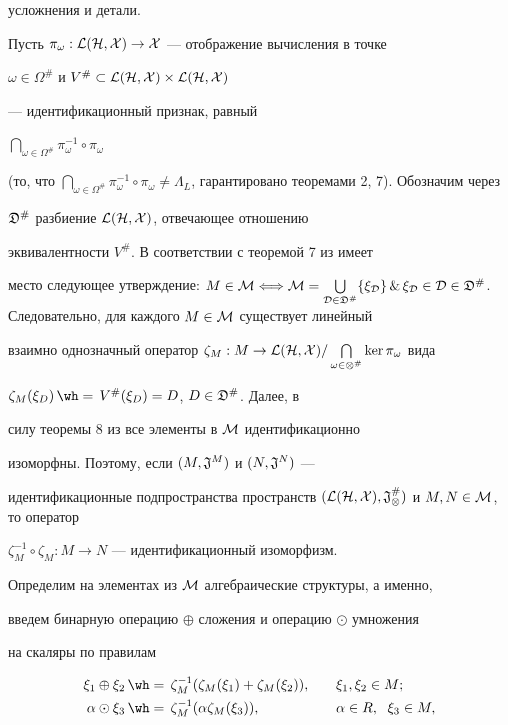 усложнения и детали. 


 


Пусть $\pi_\omega:\cal L(H,X)\to X$ --- отображение вычисления в точке 


$\omega\in\Omega^{\#}$ и $V^{\#}\subset\cal L(H,X)\times\cal L(H,X)$ 


--- идентификационный признак, равный 


$\bigcap\limits_{\omega\in\Omega^{\#}}\pi^{-1}_\omega\circ\pi_\omega$ 


(то, что $\bigcap\limits_{\omega\in\Omega^{\#}}\pi^{-1}_\omega\circ 


\pi_\omega\ne\Lambda_L$, гарантировано теоремами 2, 7). Обозначим через 


$\frak D^{\#}$ разбиение $\cal L(H,X)$, отвечающее отношению 


эквивалентности $V^{\#}$. В соответствии с теоремой 7 из \cite{1} имеет 


место следующее утверждение: $M\in\cal M\Longleftrightarrow 


M=\bigcup\limits_{D\in\frak D^{\#}}\{\xi_D\}\, \&\, \xi_D\in D\in\frak 


D^{\#}$. Следовательно, для каждого $M\in\cal M$ существует линейный 


взаимно однозначный оператор $\zeta_M:M\to\cal L(H,X)/ 


\bigcap\limits_{\omega\in\Omega^{\#}}\ker\pi_\omega$ вида 


$\zeta_M(\xi_D)\hateq V^{\#}(\xi_D)=D$, $D\in\frak D^{\#}$. Далее, в 


силу теоремы 8 из \cite{1} все элементы в $\cal M$ идентификационно 


изоморфны. Поэтому, если $(M,\frak J^M)$ и $(N,\frak J^N)$ --- 


идентификационные подпространства пространств $(\cal L(H,X),\frak 


J^{\#}_\Omega)$ и $M,N\in\cal M$, то оператор 


$\zeta^{-1}_M\circ\zeta_M:M\to N$ --- идентификационный изоморфизм. 


Определим на элементах из $\cal M$ алгебраические структуры, а именно, 


введем бинарную операцию $\oplus$ сложения и операцию $\odot$ умножения 


на скаляры по правилам 


\begin{alignat*}{2} 


\xi_1\oplus\xi_2&\hateq \zeta^{-1}_M(\zeta_M(\xi_1)+ 


\zeta_M(\xi_2)), &\quad &\xi_1,\xi_2\in M;\\ 


%


\alpha\odot\xi_3&\hateq \zeta^{-1}_M(\alpha\zeta_M(\xi_3)), 


&\quad & \alpha\in R,\ \; \xi_3\in M, 


\end{alignat*} 


